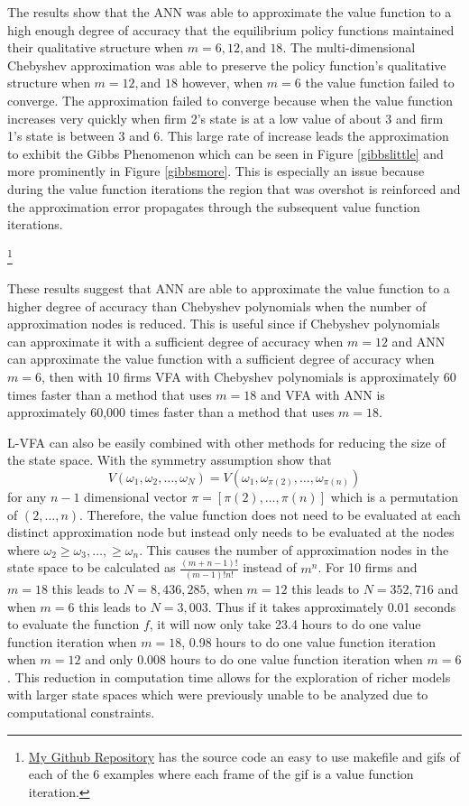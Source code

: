 \documentclass[12pt]{article}
\begin{document}
The results show that the ANN was able to approximate the value function to a high enough degree of accuracy that the equilibrium policy functions maintained their qualitative structure when $m=6,12,\text{and }18$. The multi-dimensional Chebyshev approximation was able to preserve the policy function's qualitative structure when $m=12, \text{and } 18$ however, when $m=6$ the value function failed to converge. The approximation failed to converge because when the value function increases very quickly when firm 2's state is at a low value of about 3 and firm 1's state is between 3 and 6. This large rate of increase leads the approximation to exhibit the Gibbs Phenomenon which can be seen in Figure \ref{gibbslittle} and more prominently in Figure \ref{gibbsmore}. This is especially an issue because during the value function iterations the region that was overshot is reinforced and the approximation error propagates through the subsequent value function iterations.

\footnote{\href{https://github.com/wmjones/ADP-for-dynamic-games}{My Github Repository} has the source code an easy to use makefile and gifs of each of the 6 examples where each frame of the gif is a value function iteration.}

These results suggest that ANN are able to approximate the value function to a higher degree of accuracy than Chebyshev polynomials when the number of approximation nodes is reduced. This is useful since if Chebyshev polynomials can approximate it with a sufficient degree of accuracy when $m=12$ and ANN can approximate the value function with a sufficient degree of accuracy when $m=6$, then with 10 firms VFA with Chebyshev polynomials is approximately 60 times faster than a method that uses $m=18$ and VFA with ANN is approximately 60,000 times faster than a method that uses $m=18$.

L-VFA can also be easily combined with other methods for reducing the size of the state space. With the symmetry assumption \citet{1992_Pakes_McGuire_NBER} show that
\begin{equation*}
  V(\omega_1,\omega_2,\dots,\omega_N)=V(\omega_1,\omega_{\pi(2)},\dots,\omega_{\pi(n)})
\end{equation*}
for any $n-1$ dimensional vector $\pi=[\pi(2),\dots,\pi(n)]$ which is a permutation of $(2,\dots,n)$. Therefore, the value function does not need to be evaluated at each distinct approximation node but instead only needs to be evaluated at the nodes where $\omega_2\geq \omega_3,\dots,\geq \omega_n$. This causes the number of approximation nodes in the state space to be calculated as $\frac{(m+n-1)!}{(m-1)!n!}$ instead of $m^n$. For 10 firms and $m=18$ this leads to $N=8,436,285$, when $m=12$ this leads to $N=352,716$ and when $m=6$ this leads to $N=3,003$. Thus if it takes approximately 0.01 seconds to evaluate the function $f$, it will now only take 23.4 hours to do one value function iteration when $m=18$, 0.98 hours to do one value function iteration when $m=12$ and only 0.008 hours to do one value function iteration when $m=6$. This reduction in computation time allows for the exploration of richer models with larger state spaces which were previously unable to be analyzed due to computational constraints.
\end{document}
